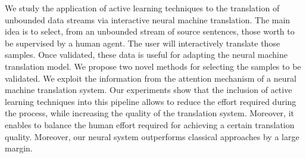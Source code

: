 We study the application of active learning techniques to the translation of unbounded data streams via interactive neural machine translation. The main idea is to select, from an unbounded stream of source sentences, those worth to be supervised by a human agent. The user will interactively translate those samples. Once validated, these data is useful for adapting the neural machine translation model. We propose two novel methods for selecting the samples to be validated. We exploit the information from the attention mechanism of a neural machine translation system. Our experiments show that the inclusion of active learning techniques into this pipeline allows to reduce the effort required during the process, while increasing the quality of the translation system. Moreover, it enables to balance the human effort required for achieving a certain translation quality. Moreover, our neural system outperforms classical approaches by a large margin.
